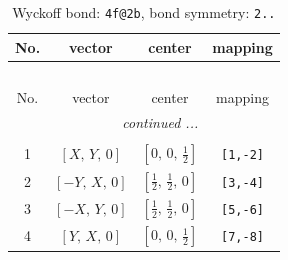 \documentclass[fleqn,8pt]{jsarticle}
\begin{document}
\renewcommand{\arraystretch}{1.2}
\begin{longtable}{cccc}
\caption{Wyckoff bond: {\tt 4f@2b}, bond symmetry: {\tt 2..}}
 \\
 \hline \hline
No. & vector & center & mapping \\ \hline \endfirsthead

\multicolumn{3}{l}{\tablename\ \thetable{}} \\
 \hline \hline
No. & vector & center & mapping \\ \hline \endhead

 \hline \hline
\multicolumn{3}{r}{\footnotesize\it continued ...} \\ \endfoot

 \hline \hline
\multicolumn{3}{r}{} \\ \endlastfoot

1 & $\left[ X,\, Y,\, 0 \right]$ & $\left[ 0,\, 0,\, \frac{1}{2} \right]$ & {\tt [1,-2]} \\ \hline
2 & $\left[ - Y,\, X,\, 0 \right]$ & $\left[ \frac{1}{2},\, \frac{1}{2},\, 0 \right]$ & {\tt [3,-4]} \\ \hline
3 & $\left[ - X,\, Y,\, 0 \right]$ & $\left[ \frac{1}{2},\, \frac{1}{2},\, 0 \right]$ & {\tt [5,-6]} \\ \hline
4 & $\left[ Y,\, X,\, 0 \right]$ & $\left[ 0,\, 0,\, \frac{1}{2} \right]$ & {\tt [7,-8]} \\
\end{longtable}
\renewcommand{\arraystretch}{1.2}
\end{document}
